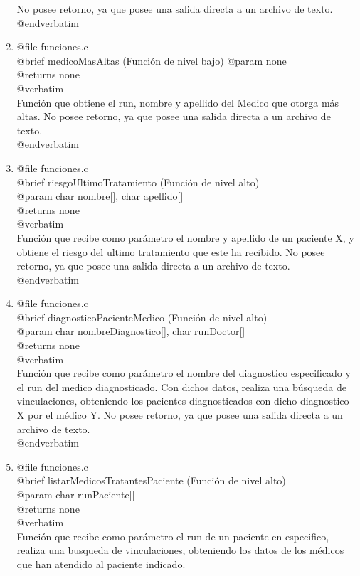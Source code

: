 \documentclass[12pt,letterpaper]{article}
\begin{document}
\begin{enumerate}
    	No posee retorno, ya que posee una salida directa a un archivo de texto.\\
    @endverbatim  
\item @file funciones.c\\
	@brief medicoMasAltas (Función de nivel bajo)
    @param none\\
    @returns none\\
    @verbatim \\
    	Función que obtiene el run, nombre y apellido del Medico que otorga más altas. No posee retorno, ya que posee una salida directa a un archivo de texto.\\
    @endverbatim   
\item @file funciones.c\\
	@brief riesgoUltimoTratamiento (Función de nivel alto) \\
    @param char nombre[], char apellido[]\\
    @returns none\\
    @verbatim \\
    	Función que recibe como parámetro el nombre y apellido de un paciente X, y obtiene el riesgo del ultimo tratamiento que este ha recibido. No posee retorno, ya que posee una salida directa a un archivo de texto.\\
    @endverbatim 
\item @file funciones.c\\
	@brief diagnosticoPacienteMedico (Función de nivel alto)\\ 
    @param char nombreDiagnostico[], char runDoctor[]\\
    @returns none\\
    @verbatim \\
    	Función que recibe como parámetro el nombre del diagnostico especificado y el run del medico diagnosticado. 
    	Con dichos datos, realiza una búsqueda de vinculaciones, obteniendo los pacientes diagnosticados con dicho diagnostico X por el médico Y.
    	No posee retorno, ya que posee una salida directa a un archivo de texto.\\
    @endverbatim   
\item @file funciones.c\\
	@brief listarMedicosTratantesPaciente (Función de nivel alto)\\
    @param char runPaciente[]\\
    @returns none\\
    @verbatim \\
    	Función que recibe como parámetro el run de un paciente en especifico, realiza una busqueda de vinculaciones, obteniendo los datos de los médicos que han atendido al paciente indicado.

\end{enumerate}
\end{document}
